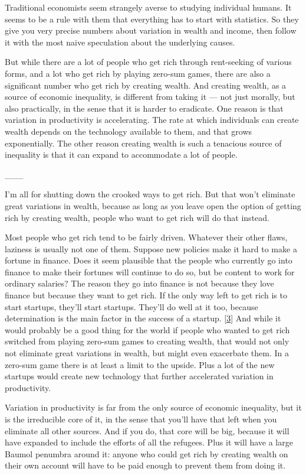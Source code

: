Traditional economists seem strangely averse to studying individual
humans. It seems to be a rule with them that everything has to start
with statistics. So they give you very precise numbers about variation
in wealth and income, then follow it with the most naive speculation
about the underlying causes.

But while there are a lot of people who get rich through rent-seeking of
various forms, and a lot who get rich by playing zero-sum games, there
are also a significant number who get rich by creating wealth. And
creating wealth, as a source of economic inequality, is different from
taking it --- not just morally, but also practically, in the sense that
it is harder to eradicate. One reason is that variation in productivity
is accelerating. The rate at which individuals can create wealth depends
on the technology available to them, and that grows exponentially. The
other reason creating wealth is such a tenacious source of inequality is
that it can expand to accommodate a lot of people.

\_\_\_

I'm all for shutting down the crooked ways to get rich. But that won't
eliminate great variations in wealth, because as long as you leave open
the option of getting rich by creating wealth, people who want to get
rich will do that instead.

Most people who get rich tend to be fairly driven. Whatever their other
flaws, laziness is usually not one of them. Suppose new policies make it
hard to make a fortune in finance. Does it seem plausible that the
people who currently go into finance to make their fortunes will
continue to do so, but be content to work for ordinary salaries? The
reason they go into finance is not because they love finance but because
they want to get rich. If the only way left to get rich is to start
startups, they'll start startups. They'll do well at it too, because
determination is the main factor in the success of a startup.
{[}\hyperref[f3n]{3}{]} And while it would probably be a good thing for
the world if people who wanted to get rich switched from playing
zero-sum games to creating wealth, that would not only not eliminate
great variations in wealth, but might even exacerbate them. In a
zero-sum game there is at least a limit to the upside. Plus a lot of the
new startups would create new technology that further accelerated
variation in productivity.

Variation in productivity is far from the only source of economic
inequality, but it is the irreducible core of it, in the sense that
you'll have that left when you eliminate all other sources. And if you
do, that core will be big, because it will have expanded to include the
efforts of all the refugees. Plus it will have a large Baumol penumbra
around it: anyone who could get rich by creating wealth on their own
account will have to be paid enough to prevent them from doing it.

